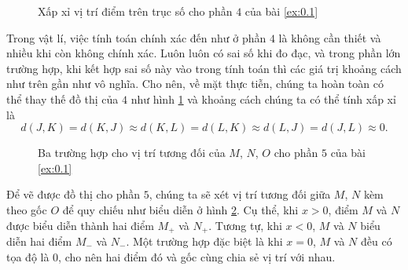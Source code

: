 \documentclass[a4paper, titlepage, openany]{book}
\begin{document}
\begin{figure}[h]
   \centering
   \caption{Xấp xỉ vị trí điểm trên trục số cho phần $4$ của bài \ref{ex:0.1}}
   \label{fig:truc bon xx}
\end{figure}

Trong vật lí, việc tính toán chính xác đến như ở phần $4$ là không cần thiết và nhiều khi còn không chính xác. Luôn luôn có sai số khi đo đạc, và trong phần lớn trường hợp, khi kết hợp sai số này vào trong tính toán thì các giá trị khoảng cách như trên gần như vô nghĩa. Cho nên, về mặt thực tiễn, chúng ta hoàn toàn có thể thay thế đồ thị của $4$ như hình \ref{fig:truc bon xx} và khoảng cách chúng ta có thể tính xấp xỉ là $$d(J,K) = d(K,J) \approx d(K,L) = d(L,K) \approx d(L,J) = d(J,L) \approx 0.$$

\begin{figure}[h]
   \centering
   \caption{Ba trường hợp cho vị trí tương đối của $M$, $N$, $O$ cho phần $5$ của bài \ref{ex:0.1}}
   \label{fig:truc phan 5}
\end{figure}

Để vẽ được đồ thị cho phần $5$, chúng ta sẽ xét vị trí tương đối giữa $M$, $N$ kèm theo gốc $O$ để quy chiếu như biểu diễn ở hình \ref{fig:truc phan 5}. Cụ thể, khi $x>0$, điểm $M$ và $N$ được biểu diễn thành hai điểm $M_+$ và $N_+$. Tương tự, khi $x<0$, $M$ và $N$ biểu diễn hai điểm $M_-$ và $N_-$. Một trường hợp đặc biệt là khi $x=0$, $M$ và $N$ đều có tọa độ là $0$, cho nên hai điểm đó và gốc cùng chia sẻ vị trí với nhau.
\end{document}
